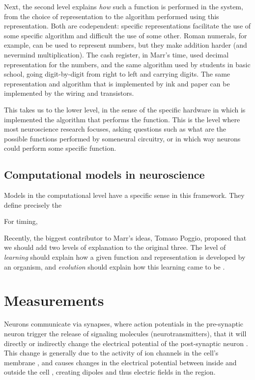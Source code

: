         Next, the second level explains \textit{how} such a function is performed in the system, from the choice of representation to the algorithm performed using this representation. Both are codependent: specific representations facilitate the use of some specific algorithm and difficult the use of some other. Roman numerals, for example, can be used to represent numbers, but they make addition harder (and nevermind multiplication). The cash register, in Marr's time, used decimal representation for the numbers, and the same algorithm used by students in basic school, going digit-by-digit from right to left and carrying digits. The same representation and algorithm that is implemented by ink and paper can be implemented by the wiring and transistors.
        
        This takes us to the lower level, in the sense of the specific hardware in which is implemented the algorithm that performs the function. This is the level where most neuroscience research focuses, asking questions such as what are the possible functions performed by someneural circuitry, or in which way neurons could perform some specific function.
    
    \subsection{Computational models in neuroscience}
        
        Models in the computational level have a specific sense in this framework. They define precisely the 
        
        For timing, 
        
        Recently, the biggest contributor to Marr's ideas, Tomaso Poggio, proposed that we should add two levels of explanation to the original three. The level of \textit{learning} should explain how a given function and representation is developed by an organism, and \textit{evolution} should explain how this learning came to be \cite{poggio2012levels}. 
        

\section{Measurements}
    Neurons communicate via synapses, where action potentials in the pre-synaptic neuron trigger the release of signaling molecules (neurotransmitters), that it will directly or indirectly change the electrical potential of the post-synaptic neuron \cite{purves2014neuroscience}. This change is generally due to the activity of ion channels in the cell's membrane \cite{purves2014neuroscience}, and causes changes in the electrical potential between inside and outside the cell \cite{purves2014neuroscience}, creating dipoles and thus electric fields in the region.
    
